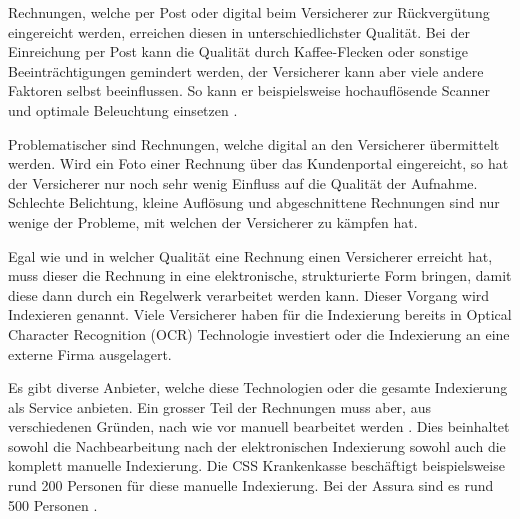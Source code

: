 \documentclass[12pt, twoside, table]{extarticle}
\begin{document}
Rechnungen, welche per Post oder digital beim Versicherer zur Rückvergütung eingereicht werden, erreichen diesen in unterschiedlichster Qualität. Bei der Einreichung per Post kann die Qualität durch Kaffee-Flecken oder sonstige Beeinträchtigungen gemindert werden, der Versicherer kann aber viele andere Faktoren selbst beeinflussen. So kann er beispielsweise hochauflösende Scanner und optimale Beleuchtung einsetzen  .


Problematischer sind Rechnungen, welche digital an den Versicherer übermittelt werden. Wird ein Foto einer Rechnung über das Kundenportal eingereicht, so hat der Versicherer nur noch sehr wenig Einfluss auf die Qualität der Aufnahme. Schlechte Belichtung, kleine Auflösung und abgeschnittene Rechnungen sind nur wenige der Probleme, mit welchen der Versicherer zu kämpfen hat.

Egal wie und in welcher Qualität eine Rechnung einen Versicherer erreicht hat, muss dieser die Rechnung in eine elektronische, strukturierte Form bringen, damit diese dann durch ein Regelwerk verarbeitet werden kann. Dieser Vorgang wird Indexieren genannt. Viele Versicherer haben für die Indexierung bereits in Optical Character Recognition (OCR) Technologie investiert oder die Indexierung an eine externe Firma ausgelagert. 

Es gibt diverse Anbieter, welche diese Technologien oder die gesamte Indexierung als Service anbieten. Ein grosser Teil der Rechnungen muss aber, aus verschiedenen Gründen, nach wie vor manuell bearbeitet werden . Dies beinhaltet sowohl die Nachbearbeitung nach der elektronischen Indexierung sowohl auch die komplett manuelle Indexierung. Die CSS Krankenkasse beschäftigt beispielsweise rund 200 Personen für diese manuelle Indexierung. Bei der Assura sind es rund 500 Personen .


\end{document}
